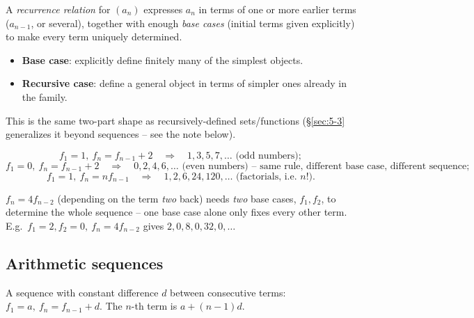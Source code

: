 \documentclass[11pt]{article}
\begin{document}
\begin{definition}
A \emph{recurrence relation} for $(a_n)$ expresses $a_n$ in terms of one or more earlier terms ($a_{n-1}$, or several), together with enough \emph{base cases} (initial terms given explicitly) to make every term uniquely determined.
\end{definition}

\begin{note}
\begin{itemize}
    \item \textbf{Base case}: explicitly define finitely many of the simplest objects.
    \item \textbf{Recursive case}: define a general object in terms of simpler ones already in the family.
\end{itemize}
This is the same two-part shape as recursively-defined sets/functions (\S\ref{sec:5-3} generalizes it beyond sequences -- see the note below).
\end{note}

\begin{example}
\[
f_1=1,\ f_n=f_{n-1}+2 \quad\Rightarrow\quad 1,3,5,7,\dots \text{ (odd numbers)};
\]
\[
f_1=0,\ f_n=f_{n-1}+2 \quad\Rightarrow\quad 0,2,4,6,\dots \text{ (even numbers)} \text{ -- same rule, different base case, different sequence};
\]
\[
f_1=1,\ f_n=nf_{n-1} \quad\Rightarrow\quad 1,2,6,24,120,\dots \text{ (factorials, i.e.\ } n!\text{)}.
\]
\end{example}

\begin{note}
$f_n=4f_{n-2}$ (depending on the term \emph{two} back) needs \emph{two} base cases, $f_1,f_2$, to determine the whole sequence -- one base case alone only fixes every other term. E.g.\ $f_1=2,f_2=0,\ f_n=4f_{n-2}$ gives $2,0,8,0,32,0,\dots$
\end{note}

\subsection{Arithmetic sequences}
\label{sec:6-3}

\begin{definition}
A sequence with constant difference $d$ between consecutive terms: $f_1=a,\ f_n=f_{n-1}+d$. The $n$-th term is $a+(n-1)d$.
\end{definition}
\end{document}
